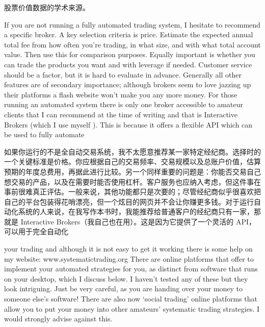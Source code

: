\begin{chineseblock}股票价值数据的学术来源。\end{chineseblock}


\begin{englishblock} If you are not running a fully automated trading system, I hesitate to recommend a specific broker. A key selection criteria is price. Estimate the expected annual total fee from how often you're trading, in what size, and with what total account value. Then use this for comparison purposes. Equally important is whether you can trade the products you want and with leverage if needed. Customer service should be a factor, but it is hard to evaluate in advance. Generally all other features are of secondary importance; although brokers seem to love jazzing up their platforms a flash website won't make you any more money. For those running an automated system there is only one broker accessible to amateur clients that I can recommend at the time of writing and that is Interactive Brokers (which I use myself ). This is because it offers a flexible API which can be used to fully automate \end{englishblock}

\begin{chineseblock}如果你运行的不是全自动交易系统，我不太愿意推荐某一家特定经纪商。选择时的一个关键标准是价格。你应根据自己的交易频率、交易规模以及总账户价值，估算预期的年度总费用，再据此进行比较。另一个同样重要的问题是：你能否交易自己想交易的产品，以及在需要时能否使用杠杆。客户服务也应纳入考虑，但这件事在事前很难真正评估。一般来说，其他功能都只是次要的；尽管经纪商似乎很喜欢把自己的平台包装得花哨漂亮，但一个炫目的网页并不会让你赚更多钱。对于运行自动化系统的人来说，在我写作本书时，我能推荐给普通客户的经纪商只有一家，那就是 Interactive Brokers（我自己也在用）。这是因为它提供了一个灵活的 API，可以用于完全自动化\end{chineseblock}

\bipairgap

\begin{englishblock} your trading and although it is not easy to get it working there is some help on my website: www.systematictrading.org There are online platforms that offer to implement your automated strategies for you, as distinct from software that runs on your desktop, which I discuss below. I haven't tested any of these but they look intriguing. Just be very careful, as you are handing over your money to someone else's software! There are also now ‘social trading' online platforms that allow you to put your money into other amateurs' systematic trading strategies. I would strongly advise against this. \end{englishblock}

